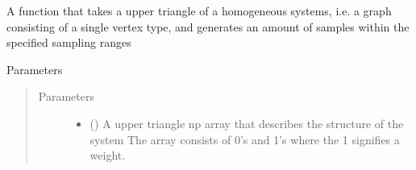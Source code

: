 \documentclass[letterpaper,10pt,english]{sphinxmanual}
\begin{document}
\begin{fulllineitems}
\begin{fulllineitems}
\begin{quote}
\begin{description}
\end{description}\end{quote}

\end{fulllineitems}


\begin{fulllineitems}
\label{\detokenize{modules/gqcml.data_generators:gqcml.data_generators.graph_sampler.graph_sampler.permutate_matrix}}
\end{fulllineitems}


\begin{fulllineitems}
\label{\detokenize{modules/gqcml.data_generators:gqcml.data_generators.graph_sampler.graph_sampler.sample_homogeneous_matrix}}
A function that takes a upper triangle of a homogeneous systems, i.e. a graph consisting of a single
vertex type, and generates an amount of samples within the specified sampling ranges

Parameters
\begin{quote}\begin{description}
\item[{Parameters}] \leavevmode\begin{itemize}
\item {} 
\sphinxstyleliteralstrong{\sphinxupquote{(}}\sphinxstyleliteralstrong{\sphinxupquote{)}} () \textendash{} A upper triangle np array that describes the structure of the system
The array consists of 0’s and 1’s where the 1 signifies a weight.


\end{itemize}
\end{description}
\end{quote}
\end{fulllineitems}
\end{fulllineitems}
\end{document}
